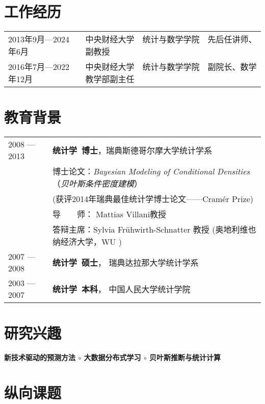 \documentclass[twoside,a4paper,11pt]{article}
\begin{document}
\section{工作经历}

\begin{tabular}{ll}
2013年9月—2024年6月  & 中央财经大学　统计与数学学院　先后任讲师、副教授 \\
2016年7月—2022年12月 & 中央财经大学　统计与数学学院　副院长、数学教学部副主任
\end{tabular}

\section{教育背景}

\begin{tabular}{ l  p{}}
  2008 --- 2013 & \textbf{统计学~博士}，瑞典斯德哥尔摩大学统计学系 \\
                & 博士论文：\emph{Bayesian Modeling of Conditional Densities}（\emph{贝叶斯条件密度建模}） \\
                & (获评2014年瑞典最佳统计学博士论文——Cramér Prize) \\
                & 导　　师： Mattias Villani教授        \\
                & 答辩主席：Sylvia Frühwirth-Schnatter 教授 (奥地利维也纳经济大学，WU ) \\
  2007 --- 2008 & \textbf{统计学~硕士}， 瑞典达拉那大学统计学系 \\
  2003 --- 2007 & \textbf{统计学~本科}， 中国人民大学统计学院    \\
\end{tabular}

\section{研究兴趣}

\textbf{新技术驱动的预测方法 $\circ$  大数据分布式学习 $\circ$ 贝叶斯推断与统计计算}

\section{纵向课题}
\end{document}
